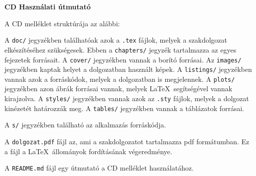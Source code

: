 \pagestyle{empty}

\noindent \textbf{\Large CD Használati útmutató}

\vskip 1cm

A CD mell\'eklet strukt\'ur\'aja az al\'abbi:

\medskip
{}
\vskip 1cm

A \texttt{doc/} jegyz\'ekben tal\'alhat\'oak azok a \texttt{.tex} f\'ajlok, melyek a szakdolgozat elk\'esz\'it\'es\'ehez
sz\"uks\'egesek. Ebben a \texttt{chapters/} jegyz\'ek tartalmazza az egyes fejezetek forr\'asait.
A \texttt{cover/} jegyz\'ekben vannak a bor\'it\'o forr\'asai.
Az \texttt{images/} jegyz\'ekben kaptak helyet a dolgozatban haszn\'alt k\'epek.
A \texttt{listings/} jegyz\'ekben vannak azok a forr\'ask\'odok, melyek a dolgozatban is megjelennek.
A \texttt{plots/} jegyz\'ekben azon \'abr\'ak forr\'asai vannak, melyek \LaTeX\ seg\'its\'eg\'evel vannak kirajzolva.
A \texttt{styles/} jegyz\'ekben vannak azok az \texttt{.sty} f\'ajlok, melyek a dolgozat kin\'ezet\'et hat\'arozz\'ak meg.
A \texttt{tables/} jegyz\'ekben vannak a t\'abl\'azatok forr\'asai.

A \texttt{s/} jegyz\'ekben tal\'alhat\'o az alkalmaz\'as forr\'ask\'odja.

A \texttt{dolgozat.pdf} f\'ajl az, ami a szakdolgozatot tartalmazza pdf form\'atumban.
Ez a f\'ajl a \LaTeX\ \'allom\'anyok ford\'it\'as\'anak v\'egeredm\'enye.

A \texttt{README.md} f\'ajl egy \'utmutat\'o a CD mell\'eklet haszn\'alat\'ahoz.